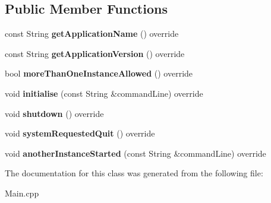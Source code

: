 \subsection*{Public Member Functions}
\begin{DoxyCompactItemize}
\item 
\mbox{\label{class_auris_application_a2e19b4a1d9e6ae207ba9f9b4a020dbd9}} 
const String {\bfseries get\+Application\+Name} () override
\item 
\mbox{\label{class_auris_application_ac0c4e3abb84ed86dbf6da95caeaeb265}} 
const String {\bfseries get\+Application\+Version} () override
\item 
\mbox{\label{class_auris_application_a110eefa50edd79d73ba8f9bfec94f583}} 
bool {\bfseries more\+Than\+One\+Instance\+Allowed} () override
\item 
\mbox{\label{class_auris_application_a22948194edcf1901e901dcb906ef5ac6}} 
void {\bfseries initialise} (const String \&command\+Line) override
\item 
\mbox{\label{class_auris_application_ad1d1d44adb3e39d5654eb9e3636289bd}} 
void {\bfseries shutdown} () override
\item 
\mbox{\label{class_auris_application_a86775ba68afafbb5a276f4c31a6e9810}} 
void {\bfseries system\+Requested\+Quit} () override
\item 
\mbox{\label{class_auris_application_a1241266dab06cd5e51e09a0118627920}} 
void {\bfseries another\+Instance\+Started} (const String \&command\+Line) override
\end{DoxyCompactItemize}


The documentation for this class was generated from the following file\+:\begin{DoxyCompactItemize}
\item 
Main.\+cpp\end{DoxyCompactItemize}
